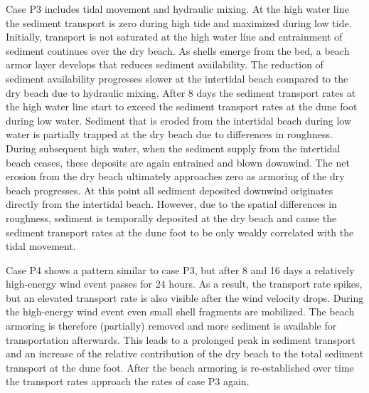 Case P3 includes tidal movement and hydraulic mixing. At the high
water line the sediment transport is zero during high tide and
maximized during low tide. Initially, transport is not saturated at
the high water line and entrainment of sediment continues over the dry
beach. As shells emerge from the bed, a beach armor layer develops
that reduces sediment availability. The reduction of sediment
availability progresses slower at the intertidal beach compared to the
dry beach due to hydraulic mixing. After 8 days the sediment transport
rates at the high water line start to exceed the sediment transport
rates at the dune foot during low water. Sediment that is eroded from
the intertidal beach during low water is partially trapped at the dry
beach due to differences in roughness. During subsequent high water,
when the sediment supply from the intertidal beach ceases, these
deposits are again entrained and blown downwind. The net erosion from
the dry beach ultimately approaches zero as armoring of the dry beach
progresses. At this point all sediment deposited downwind originates
directly from the intertidal beach. However, due to the spatial
differences in roughness, sediment is temporally deposited at the dry
beach and cause the sediment transport rates at the dune foot to be
only weakly correlated with the tidal movement.

Case P4 shows a pattern similar to case P3, but after 8 and 16 days a
relatively high-energy wind event passes for 24 hours. As a result,
the transport rate spikes, but an elevated transport rate is also
visible after the wind velocity drops.  During the high-energy wind
event even small shell fragments are mobilized. The beach armoring is
therefore (partially) removed and more sediment is available for
transportation afterwards. This leads to a prolonged peak in sediment
transport and an increase of the relative contribution of the dry
beach to the total sediment transport at the dune foot. After the
beach armoring is re-established over time the transport rates
approach the rates of case P3 again.

